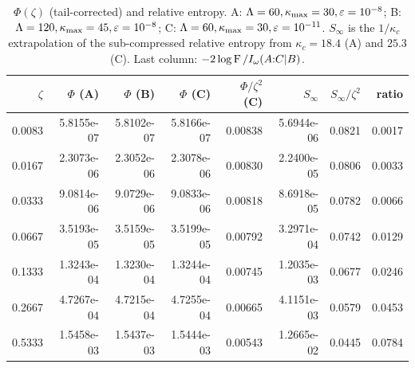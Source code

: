 \begin{table}[ht]\centering\small
\caption{\(\Phi(\zeta)\) (tail-corrected) and relative entropy. A: \(\Lambda=60,\kappa_{\max}=30,\varepsilon=10^{-8}\); B: \(\Lambda=120,\kappa_{\max}=45,\varepsilon=10^{-8}\); C: \(\Lambda=60,\kappa_{\max}=30,\varepsilon=10^{-11}\). \(S_\infty\) is the \(1/\kappa_c\) extrapolation of the sub-compressed relative entropy from \(\kappa_c=18.4\) (A) and \(25.3\) (C). Last column: \(-2\log\operatorname{F}/I_\omega(A{:}C|B)\).}\label{tab:scan}
\begin{tabular}{r rrr r r r r}\toprule
\(\zeta\) & \(\Phi\) (A) & \(\Phi\) (B) & \(\Phi\) (C) & \(\Phi/\zeta^2\) (C) & \(S_\infty\) & \(S_\infty/\zeta^2\) & ratio \\\midrule
0.0083 & 5.8155e-07 & 5.8102e-07 & 5.8166e-07 & 0.00838 & 5.6944e-06 & 0.0821 & 0.0017 \\
0.0167 & 2.3073e-06 & 2.3052e-06 & 2.3078e-06 & 0.00830 & 2.2400e-05 & 0.0806 & 0.0033 \\
0.0333 & 9.0814e-06 & 9.0729e-06 & 9.0833e-06 & 0.00818 & 8.6918e-05 & 0.0782 & 0.0066 \\
0.0667 & 3.5193e-05 & 3.5159e-05 & 3.5199e-05 & 0.00792 & 3.2971e-04 & 0.0742 & 0.0129 \\
0.1333 & 1.3243e-04 & 1.3230e-04 & 1.3244e-04 & 0.00745 & 1.2035e-03 & 0.0677 & 0.0246 \\
0.2667 & 4.7267e-04 & 4.7215e-04 & 4.7255e-04 & 0.00665 & 4.1151e-03 & 0.0579 & 0.0453 \\
0.5333 & 1.5458e-03 & 1.5437e-03 & 1.5444e-03 & 0.00543 & 1.2665e-02 & 0.0445 & 0.0784 \\
\bottomrule\end{tabular}\end{table}
